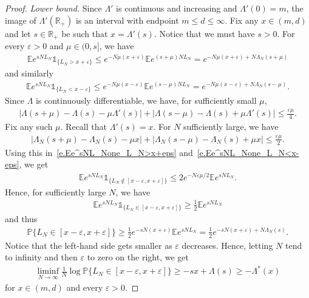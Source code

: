 \documentclass[11pt]{amsart}
\theoremstyle{remark}
\theoremstyle{definition}
\numberwithin{equation}{section}
\numberwithin{proposition}{section}
\numberwithin{figure}{section}
\numberwithin{table}{section}
\newcommand{\R}{\mathbb{R}}
\newcommand{\E}{\mathbb{E}}
\renewcommand{\P}{\mathbb{P}}
\newcommand{\eps}{\varepsilon}
\renewcommand{\leq}{\leqslant}
\renewcommand{\geq}{\geqslant}
\newcommand{\Ll}{\left}
\newcommand{\Rr}{\right}
\newcommand{\1}{\mathbf{1}}
\begin{document}
\begin{proof}
\textit{Lower bound.}
Since $\Lambda'$ is continuous and increasing and $\Lambda'(0)=m$, the image of $\Lambda'(\R_+)$  is an interval with endpoint $m\leq d \leq \infty$. Fix any $x\in (m,d)$ and let $s\in\R_+$ be such that $x= \Lambda'(s)$. Notice that we must have $s>0$.
For every $\eps>0$ and $\mu\in(0,s]$, we have
\begin{align}\label{e.Ee^sNL_None_L_N>x+eps}
    \E e^{sNL_N}\mathds{1}_{\{L_N> x+\eps\}} \leq e^{-N\mu(x+\eps)}\E e^{(s+\mu)NL_N} = e^{-N\mu(x+\eps)+N\Lambda_N(s+\mu)}
\end{align}
and similarly
\begin{align}\label{e.Ee^sNL_None_L_N<x-eps}
    \E e^{sNL_N}\mathds{1}_{\{L_N< x-\eps\}} \leq e^{-N\mu(x-\eps)}\E e^{(s-\mu)NL_N} = e^{-N\mu(x-\eps)+N\Lambda_N(s-\mu)}.
\end{align}
Since $\Lambda$ is continuously differentiable, we have, for sufficiently small $\mu$,
\begin{align*}
    \Ll|\Lambda(s+\mu)-\Lambda(s)-\mu\Lambda'(s)\Rr| + \Ll|\Lambda(s-\mu)-\Lambda(s)+\mu\Lambda'(s)\Rr|\leq \tfrac{\eps\mu}{4}.
\end{align*}
Fix any such $\mu$. Recall that $\Lambda'(s)=x$. For $N$ sufficiently large, we have
\begin{align*}
    \Ll|\Lambda_N(s+\mu)-\Lambda_N(s)-\mu x\Rr| + \Ll|\Lambda_N(s-\mu)-\Lambda_N(s)+\mu x\Rr|\leq \tfrac{\eps\mu}{2}.
\end{align*}
Using this in~\eqref{e.Ee^sNL_None_L_N>x+eps} and~\eqref{e.Ee^sNL_None_L_N<x-eps}, we get
\begin{align*}
    \E e^{s NL_N}\mathds{1}_{\{L_N\not\in [x-\eps,x+\eps]\}}\leq 2 e^{-N\eps\mu/2}\E e^{s NL_N}.
\end{align*}
Hence, for sufficiently large $N$, we have
\begin{align*}
    \E e^{s NL_N}\mathds{1}_{\{L_N\in [x-\eps,x+\eps]\}}\geq \tfrac{1}{2}\E e^{s NL_N}
\end{align*}
and thus
\begin{align*}
    \P\{L_N\in [x-\eps,x+\eps]\} 
    \geq \tfrac{1}{2}e^{-sN(x+\eps)}\E e^{sNL_N}=\tfrac{1}{2}e^{-sN(x+\eps)+N\Lambda_N(s)}.
\end{align*}
Notice that the left-hand side gets smaller as $\eps$ decreases. Hence, letting $N$ tend to infinity and then $\eps$ to zero on the right, we get
\begin{align}\label{e.liminf1/NlogP(x-eps,x+eps)}
    \liminf_{N\to\infty} \frac{1}{N}\log \P\{L_N\in [x-\eps,x+\eps]\} \geq -sx + \Lambda(s) \geq -\Lambda^*(x)
\end{align}
for $x\in (m,d)$ and every $\eps>0$.


\end{proof}
\end{document}
